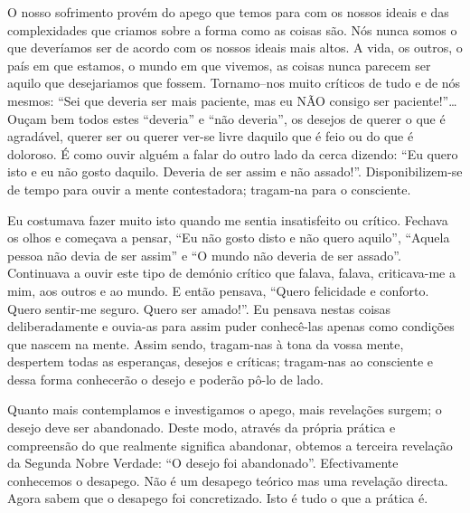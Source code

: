 O nosso sofrimento provém do apego que temos para com os nossos ideais e das
complexidades que criamos sobre a forma como as coisas são. Nós nunca somos o
que deveríamos ser de acordo com os nossos ideais mais altos. A vida, os outros,
o país em que estamos, o mundo em que vivemos, as coisas nunca parecem ser
aquilo que desejariamos que fossem. Tornamo--nos muito críticos de tudo e de nós
mesmos: “Sei que deveria ser mais paciente, mas eu NÃO consigo ser
paciente!”\ldots{} Ouçam bem todos estes “deveria” e “não deveria”, os desejos
de querer o que é agradável, querer ser ou querer ver-se livre daquilo que é
feio ou do que é doloroso. É como ouvir alguém a falar do outro lado da cerca
dizendo: “Eu quero isto e eu não gosto daquilo. Deveria de ser assim e não
assado!”. Disponibilizem-se de tempo para ouvir a mente contestadora; tragam-na
para o consciente.

Eu costumava fazer muito isto quando me sentia insatisfeito ou crítico. Fechava
os olhos e começava a pensar, “Eu não gosto disto e não quero aquilo”, “Aquela
pessoa não devia de ser assim” e “O mundo não deveria de ser assado”. Continuava
a ouvir este tipo de demónio crítico que falava, falava, criticava-me a mim, aos
outros e ao mundo. E então pensava, “Quero felicidade e conforto. Quero
sentir-me seguro. Quero ser amado!”. Eu pensava nestas coisas deliberadamente e
ouvia-as para assim puder conhecê-las apenas como condições que nascem na mente.
Assim sendo, tragam-nas à tona da vossa mente, despertem todas as esperanças,
desejos e críticas; tragam-nas ao consciente e dessa forma conhecerão o desejo e
poderão pô-lo de lado.

Quanto mais contemplamos e investigamos o apego, mais revelações surgem; o
desejo deve ser abandonado. Deste modo, através da própria prática e compreensão
do que realmente significa abandonar, obtemos a terceira revelação da Segunda
Nobre Verdade: “O desejo foi abandonado”. Efectivamente conhecemos o desapego.
Não é um desapego teórico mas uma revelação directa. Agora sabem que o desapego
foi concretizado. Isto é tudo o que a prática é.

